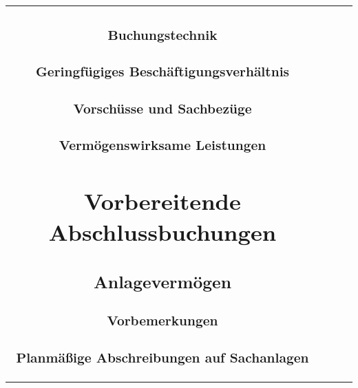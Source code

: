 \documentclass[paper=a4, fontsize=11pt]{scrartcl}
\numberwithin{equation}{section}
\numberwithin{figure}{section}
\numberwithin{table}{section}
\begin{document}
\begin{tabular}{cc|cc}

\subsubsection{Buchungstechnik}


\subsubsection{Geringfügiges Beschäftigungsverhältnis}


\subsubsection{Vorschüsse und Sachbezüge}


\subsubsection{Vermögenswirksame Leistungen}


\newpage

\section{Vorbereitende Abschlussbuchungen}


\subsection{Anlagevermögen}


\subsubsection{Vorbemerkungen}


\subsubsection{Planmäßige Abschreibungen auf Sachanlagen}


\end{tabular}
\end{document}
